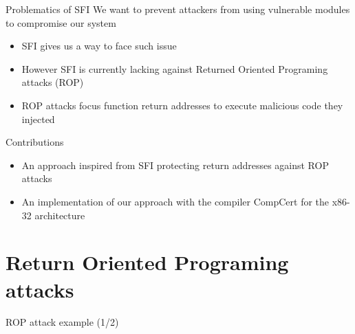 \documentclass{beamer}
\begin{document}
\begin{frame}[c]{Problematics of SFI}
We want to prevent attackers from using vulnerable modules to compromise our system
	\begin{itemize}
		\item SFI gives us a way to face such issue
		\item However SFI is currently lacking against Returned Oriented Programing attacks (ROP)
		\item ROP attacks focus function return addresses to execute malicious code they injected
	\end{itemize}
\end{frame}

\begin{frame}[c]{Contributions}
\begin{itemize}\itemsep20pt
		\item An approach inspired from SFI protecting return addresses against ROP attacks
		\item An implementation of our approach with the compiler CompCert for the x86-32 architecture
	\end{itemize}
\end{frame}

\section{Return Oriented Programing attacks}
\label{sec:Return Oriented Programing attacks}


\begin{frame}{ROP attack example (1/2)}
	\Buffer
\end{frame}
\end{document}
